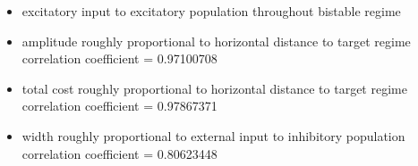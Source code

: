 \documentclass[]{article}
\begin{document}
\begin{minipage}{0.65\textwidth}
	\begin{itemize}
		\item excitatory input to excitatory population throughout bistable regime
		\item amplitude roughly proportional to horizontal distance to target regime\\
		correlation coefficient = 0.97100708
		\item total cost roughly proportional to horizontal distance to target regime\\
		correlation coefficient = 0.97867371
		\item width roughly proportional to external input to inhibitory population\\
		correlation coefficient = 0.80623448
	\end{itemize}
\end{minipage}
\end{document}
